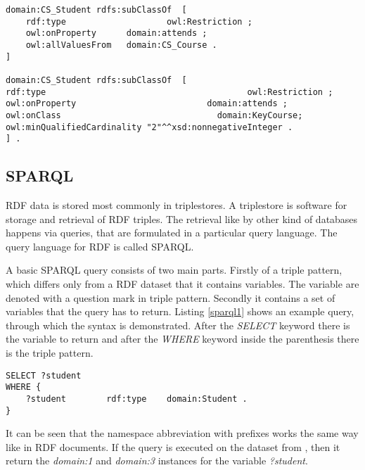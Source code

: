 \begin{lstlisting}[basicstyle=\footnotesize, captionpos=b, caption=Restrictions defined as blank nodes, label=lst:sparql, belowskip=1em, aboveskip=2em,
frame=single]
domain:CS_Student rdfs:subClassOf  [ 
	rdf:type					owl:Restriction ; 
	owl:onProperty		domain:attends ; 
	owl:allValuesFrom	domain:CS_Course .
]

domain:CS_Student rdfs:subClassOf  [
rdf:type										owl:Restriction ; 
owl:onProperty							domain:attends ; 
owl:onClass								  domain:KeyCourse; 
owl:minQualifiedCardinality "2"^^xsd:nonnegativeInteger .
] .
\end{lstlisting}


\subsection{SPARQL}


RDF data is stored most commonly in triplestores. A triplestore is software for storage and retrieval of RDF triples. The retrieval like by other kind of databases happens via queries, that are formulated in a particular query language. The query language for RDF is called SPARQL. 

A basic SPARQL query consists of two main parts. Firstly of a triple pattern, which differs only from a RDF dataset that it contains variables. The variable are denoted with a question mark in triple pattern. Secondly it contains a set of variables that the query has to return. Listing \ref{sparql1} shows an example query, through which the syntax is demonstrated. After the \textit{SELECT} keyword there is the variable to return and after the \textit{WHERE} keyword inside the parenthesis there is the triple pattern.

\begin{lstlisting}[captionpos=b, caption=SPARQL Query I., label=sparql1, belowskip=1em, aboveskip=2em, 
basicstyle=\footnotesize,frame=single]
SELECT ?student  
WHERE { 
	?student		rdf:type	domain:Student .	
}
\end{lstlisting}


It can be seen that the namespace abbreviation with prefixes works the same way like in RDF documents. If the query is executed on the dataset from , then it return the \textit{domain:1} and \textit{domain:3} instances for the variable \textit{?student}. 





